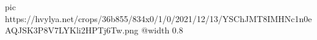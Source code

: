  
 
 
 
 

\ifcmt
  pic https://hvylya.net/crops/36b855/834x0/1/0/2021/12/13/YSChJMT8IMHNc1n0eAQJSK3P8V7LYKli2HPTj6Tw.png
  @width 0.8
\fi

\begin{center}
\end{center}
